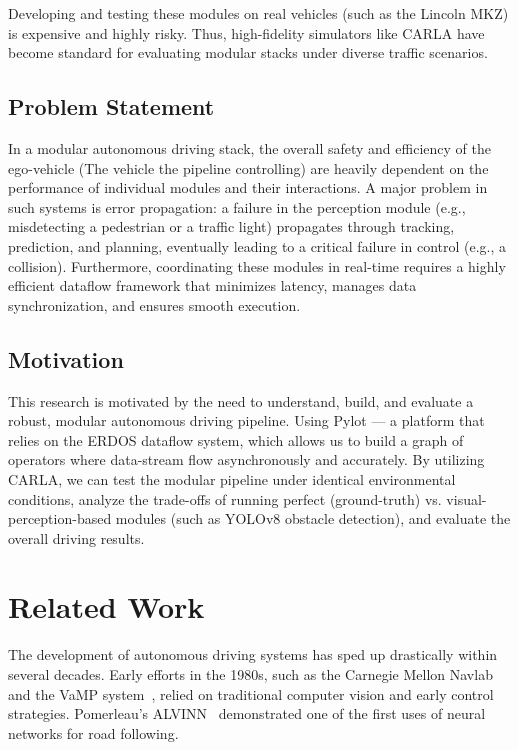 \documentclass[11pt,a4paper]{report}
\begin{document}
Developing and testing these modules on real vehicles (such as the Lincoln MKZ) is expensive and highly risky. Thus, high-fidelity simulators like CARLA have become standard for evaluating modular stacks under diverse traffic scenarios.

\subsection{Problem Statement}
In a modular autonomous driving stack, the overall safety and efficiency of the ego-vehicle (The vehicle the pipeline controlling) are heavily dependent on the performance of individual modules and their interactions. A major problem in such systems is error propagation: a failure in the perception module (e.g., misdetecting a pedestrian or a traffic light) propagates through tracking, prediction, and planning, eventually leading to a critical failure in control (e.g., a collision). Furthermore, coordinating these modules in real-time requires a highly efficient dataflow framework that minimizes latency, manages data synchronization, and ensures smooth execution.

\subsection{Motivation}
This research is motivated by the need to understand, build, and evaluate a robust, modular autonomous driving pipeline. Using Pylot — a platform that relies on the ERDOS dataflow system, which allows us to build a graph of operators where data-stream flow asynchronously and accurately. By utilizing CARLA, we can test the modular pipeline under identical environmental conditions, analyze the trade-offs of running perfect (ground-truth) vs. visual-perception-based modules (such as YOLOv8 obstacle detection), and evaluate the overall driving results.

\section{Related Work}
\label{sec:related_work}
The development of autonomous driving systems has sped up drastically within several decades. Early efforts in the 1980s, such as the Carnegie Mellon Navlab~\cite{thorpe1988} and the VaMP system~\cite{dickmanns1994, dickmanns1986}, relied on traditional computer vision and early control strategies. Pomerleau's ALVINN~\cite{alvinn1989} demonstrated one of the first uses of neural networks for road following.
\end{document}
